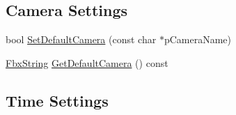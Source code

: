 \subsection*{Camera Settings}
\begin{DoxyCompactItemize}
\item 
bool \hyperlink{class_fbx_global_settings_a4aad864358aa7d13705fcef1896967ba}{Set\+Default\+Camera} (const char $\ast$p\+Camera\+Name)
\item 
\hyperlink{class_fbx_string}{Fbx\+String} \hyperlink{class_fbx_global_settings_a7a173e83989d4256dbcfc48b72c07655}{Get\+Default\+Camera} () const
\end{DoxyCompactItemize}
\subsection*{Time Settings}
